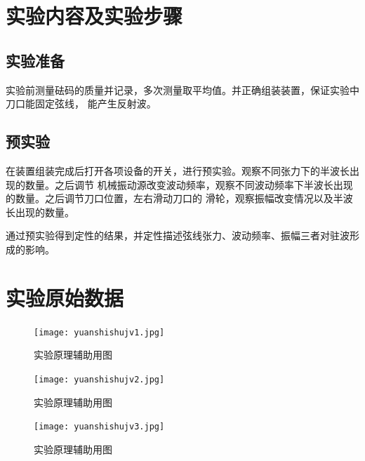 \documentclass{ctexart}
\begin{document}
\section{实验内容及实验步骤}
  \subsection{实验准备}
  实验前测量砝码的质量并记录，多次测量取平均值。并正确组装装置，保证实验中刀口能固定弦线，
  能产生反射波。
  \subsection{预实验}
  在装置组装完成后打开各项设备的开关，进行预实验。观察不同张力下的半波长出现的数量。之后调节
  机械振动源改变波动频率，观察不同波动频率下半波长出现的数量。之后调节刀口位置，左右滑动刀口的
  滑轮，观察振幅改变情况以及半波长出现的数量。

  通过预实验得到定性的结果，并定性描述弦线张力、波动频率、振幅三者对驻波形成的影响。
  \subsection{}

  \subsection{}
    \subsubsection{}
    \subsubsection{}

  \subsection{}
\newpage

\section{实验原始数据}
\begin{figure}[h]
  \centering
  \texttt{[image: yuanshishujv1.jpg]}
  \caption{实验原理辅助用图}\label{yuanshishujv1}
\end{figure}
\newpage
\begin{figure}[h]
  \centering
  \texttt{[image: yuanshishujv2.jpg]}
  \caption{实验原理辅助用图}\label{yuanshishujv2}
\end{figure}
\newpage
\begin{figure}[h]
  \centering
  \texttt{[image: yuanshishujv3.jpg]}
  \caption{实验原理辅助用图}\label{yuanshishujv3}
\end{figure}
\newpage
\end{document}
